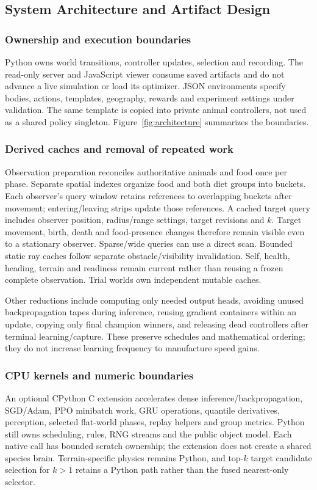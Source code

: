 \subsection{System Architecture and Artifact Design}\label{sec:systems}
\subsubsection{Ownership and execution boundaries}
Python owns world transitions, controller updates, selection and recording.
The read-only server and JavaScript viewer consume saved artifacts and do not
advance a live simulation or load its optimizer. JSON environments specify
bodies, actions, templates, geography, rewards and experiment settings under
validation. The same template is copied into private animal controllers, not
used as a shared policy singleton. Figure~\ref{fig:architecture} summarizes the
boundaries.

\subsubsection{Derived caches and removal of repeated work}
Observation preparation reconciles authoritative animals and food once per
phase. Separate spatial indexes organize food and both diet groups into buckets.
Each observer's query window retains references to overlapping buckets after
movement; entering/leaving strips update those references. A cached target query
includes observer position, radius/range settings, target revisions and $k$.
Target movement, birth, death and food-presence changes therefore remain visible
even to a stationary observer. Sparse/wide queries can use a direct scan.
Bounded static ray caches follow separate obstacle/visibility invalidation.
Self, health, heading, terrain and readiness remain current rather than reusing
a frozen complete observation. Trial worlds own independent mutable caches.

Other reductions include computing only needed output heads, avoiding unused
backpropagation tapes during inference, reusing gradient containers within an
update, copying only final champion winners, and releasing dead controllers
after terminal learning/capture. These preserve schedules and mathematical
ordering; they do not increase learning frequency to manufacture speed gains.

\subsubsection{CPU kernels and numeric boundaries}
An optional CPython C extension accelerates dense inference/backpropagation,
SGD/Adam, PPO minibatch work, GRU operations, quantile derivatives, perception,
selected flat-world phases, replay helpers and group metrics. Python still owns
scheduling, rules, RNG streams and the public object model. Each native call has
bounded scratch ownership; the extension does not create a shared species brain.
Terrain-specific physics remains Python, and top-$k$ target candidate selection
for $k>1$ retains a Python path rather than the fused nearest-only selector.

